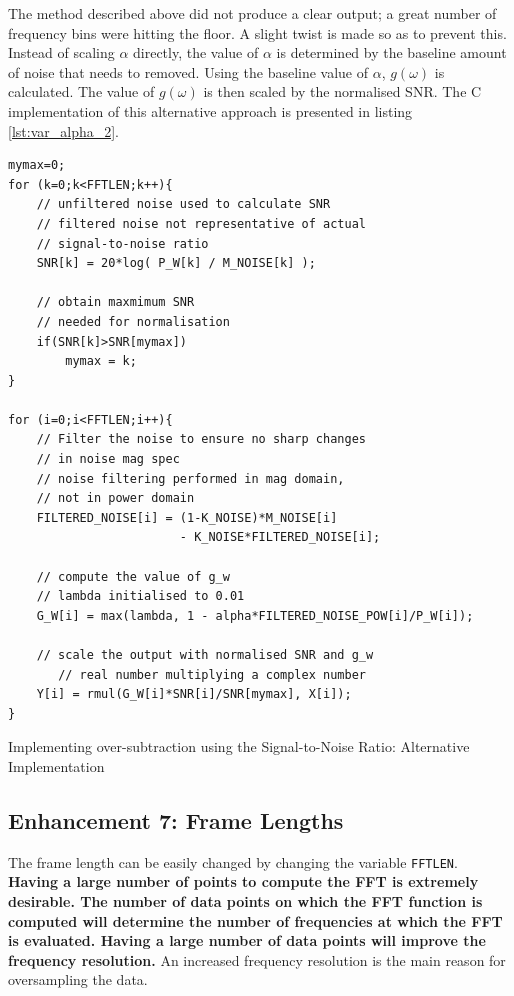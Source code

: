 \documentclass[a4paper,pra,twocolumn,10pt,aps,longbibliography,nobalancelastpage]{revtex4-1}
\begin{document}
The method described above did not produce a clear output; a great number of frequency bins were hitting the floor. A slight twist is made so as to prevent this. Instead of scaling $\alpha$ directly, the value of $\alpha$ is determined by the baseline amount of noise that needs to removed. Using the baseline value of $\alpha$, $g(\omega)$ is calculated. The value of $g(\omega)$ is then scaled by the normalised SNR. The C implementation of this alternative approach is presented in listing \ref{lst:var_alpha_2}.

\begin{listing}[H]
\begin{verbatim}
mymax=0;
for (k=0;k<FFTLEN;k++){ 
    // unfiltered noise used to calculate SNR
    // filtered noise not representative of actual 
    // signal-to-noise ratio
	SNR[k] = 20*log( P_W[k] / M_NOISE[k] );
    
    // obtain maxmimum SNR
    // needed for normalisation
	if(SNR[k]>SNR[mymax])
		mymax = k;
}

for (i=0;i<FFTLEN;i++){
    // Filter the noise to ensure no sharp changes 
    // in noise mag spec
    // noise filtering performed in mag domain,
    // not in power domain
    FILTERED_NOISE[i] = (1-K_NOISE)*M_NOISE[i] 
                        - K_NOISE*FILTERED_NOISE[i];
                        
    // compute the value of g_w
    // lambda initialised to 0.01
    G_W[i] = max(lambda, 1 - alpha*FILTERED_NOISE_POW[i]/P_W[i]);
    
    // scale the output with normalised SNR and g_w
       // real number multiplying a complex number
    Y[i] = rmul(G_W[i]*SNR[i]/SNR[mymax], X[i]);
}
\end{verbatim}
\caption{Implementing over-subtraction using the Signal-to-Noise Ratio: Alternative Implementation} 
\label{lst:var_alpha_2}
\end{listing}

\subsection{Enhancement 7: Frame Lengths}
The frame length can be easily changed by changing the variable {\tt FFTLEN}. \textbf{Having a large number of points to compute the FFT is extremely desirable. The number of data points on which the FFT function is computed will determine the number of frequencies at which the FFT is evaluated. Having a large number of data points will improve the frequency resolution.} An increased frequency resolution is the main reason for oversampling the data. 
\end{document}
